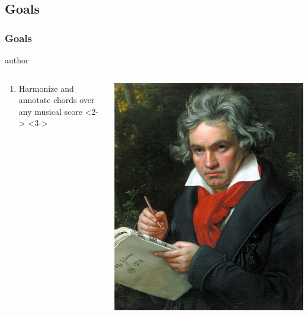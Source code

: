 \documentclass[english,handout]{beamer}
\begin{document}
\subsection{Goals}
	\begin{frame}
		\frametitle{Goals}
			\begin{beamercolorbox}[leftskip=8cm,center,wd=0.7\textwidth]{author}
			\begin{columns}[T]
			\begin{column}{.60\textwidth}%
				\begin{enumerate}
					\item \alert{Harmonize} and annotate chords over any musical score
					<2->
					<3->
				\end{enumerate}
			\end{column}
			\begin{column}{.39\textwidth}%
			\includegraphics[width=\linewidth]{imagenes/Beethoven.jpg}
			\end{column}
			\end{columns}
			\end{beamercolorbox}
	\end{frame}
\end{document}
